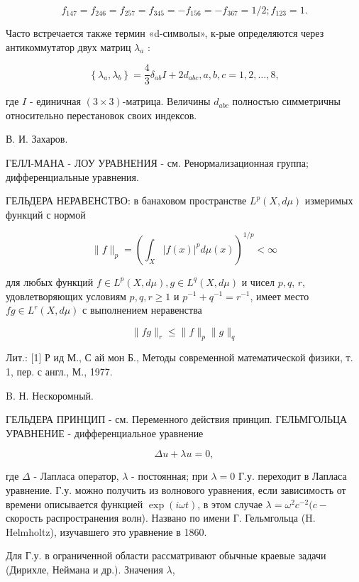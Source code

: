 \documentclass[10pt]{article}
\begin{document}
\[

f_{147}=f_{246}=f_{257}=f_{345}=-f_{156}=-f_{367}=1 / 2 ; f_{123}=1 .

\]



Часто встречается также термин «d-символы», к-рые определяются через антикоммутатор двух матриц $\lambda_{a}$ :



\[

\left\{\lambda_{a}, \lambda_{b}\right\}=\frac{4}{3} \delta_{a b} I+2 d_{a b c}, a, b, c=1,2, \ldots, 8,

\]



где $I$ - единичная $(3 \times 3)$-матрица. Величины $d_{a b c}$ полностью симметричны относительно перестановок своих индексов.



В. И. Захаров.



ГЕЛЛ-МАНА - ЛОУ УРАВНЕНИЯ - см. Ренормализационная группа; дифференциальные уравнения.



ГЕЛЬДЕРА НЕРАВЕНСТВО: в банаховом пространстве $L^{p}(X, d \mu)$ измеримых функций с нормой



\[

\|f\|_{p}=\left(\int_{X}|f(x)|^{p} d \mu(x)\right)^{1 / p}<\infty

\]



для любых функций $f \in L^{p}(X, d \mu), g \in L^{q}(X, d \mu)$ и чисел $p, q$, $r$, удовлетворяющих условиям $p, q, r \geqslant 1$ и $p^{-1}+q^{-1}=r^{-1}$, имеет место $f g \in L^{r}(X, d \mu)$ с выполнением неравенства



\[

\|f g\|_{r} \leqslant\|f\|_{p}\|g\|_{q}

\]



Лит.: [1] Р ид М., С ай мон Б., Методы современной математической физики, т. 1, пер. с англ., М., 1977.



B. Н. Нескоромный.



ГЕЛЬДЕРА ПРИНЦИП - см. Переменного действия принцип. ГЕЛЬМГОЛЬЦА УРАВНЕНИЕ - дифференциальное уравнение



\[

\Delta u+\lambda u=0,

\]



где $\Delta$ - Лапласа оператор, $\lambda$ - постоянная; при $\lambda=0$ Г.у. переходит в Лапласа уравнение. Г.у. можно получить из волнового уравнения, если зависимость от времени описывается функцией $\exp (i \omega t)$, в этом случае $\lambda=\omega^{2} c^{-2}(c-$ скорость распространения волн). Названо по имени Г. Гельмгольца (H. Helmholtz), изучавшего это уравнение в 1860.



Для Г.у. в ограниченной области рассматривают обычные краевые задачи (Дирихле, Неймана и др.). Значения $\lambda$,
\end{document}
